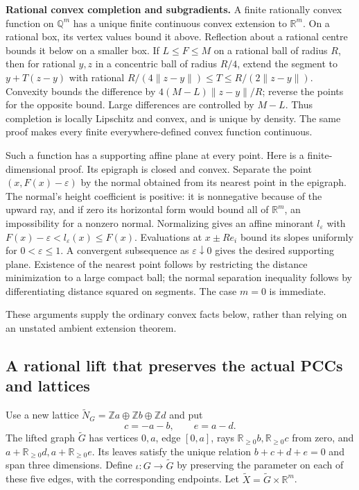 \documentclass[
  11pt,
]{article}
\begin{document}
\textbf{Rational convex completion and subgradients.} A finite
rationally convex function on \(\mathbb Q^m\) has a unique finite
continuous convex extension to \(\mathbb R^m\). On a rational box, its
vertex values bound it above. Reflection about a rational centre bounds
it below on a smaller box. If \(L\leq F\leq M\) on a rational ball of
radius \(R\), then for rational \(y,z\) in a concentric ball of radius
\(R/4\), extend the segment to \(y+T(z-y)\) with rational
\(R/(4\|z-y\|)\leq T\leq R/(2\|z-y\|)\). Convexity bounds the difference
by \(4(M-L)\|z-y\|/R\); reverse the points for the opposite bound. Large
differences are controlled by \(M-L\). Thus completion is locally
Lipschitz and convex, and is unique by density. The same proof makes
every finite everywhere-defined convex function continuous.

Such a function has a supporting affine plane at every point. Here is a
finite-dimensional proof. Its epigraph is closed and convex. Separate
the point \((x,F(x)-\varepsilon)\) by the normal obtained from its
nearest point in the epigraph. The normal's height coefficient is
positive: it is nonnegative because of the upward ray, and if zero its
horizontal form would bound all of \(\mathbb R^m\), an impossibility for
a nonzero normal. Normalizing gives an affine minorant \(l_\varepsilon\)
with \(F(x)-\varepsilon<l_\varepsilon(x)\leq F(x)\). Evaluations at
\(x\pm Re_i\) bound its slopes uniformly for \(0<\varepsilon\leq1\). A
convergent subsequence as \(\varepsilon\downarrow0\) gives the desired
supporting plane. Existence of the nearest point follows by restricting
the distance minimization to a large compact ball; the normal separation
inequality follows by differentiating distance squared on segments. The
case \(m=0\) is immediate.

These arguments supply the ordinary convex facts below, rather than
relying on an unstated ambient extension theorem.

\subsection{A rational lift that preserves the actual PCCs and
lattices}\label{a-rational-lift-that-preserves-the-actual-pccs-and-lattices}

Use a new lattice
\(\widetilde N_G=\mathbb Za\oplus\mathbb Zb\oplus\mathbb Zd\) and put \[
c=-a-b,\qquad e=a-d.
\] The lifted graph \(\widetilde G\) has vertices \(0,a\), edge
\([0,a]\), rays \(\mathbb R_{\geq0}b,\mathbb R_{\geq0}c\) from zero, and
\(a+\mathbb R_{\geq0}d,a+\mathbb R_{\geq0}e\). Its leaves satisfy the
unique relation \(b+c+d+e=0\) and span three dimensions. Define
\(\iota:G\to\widetilde G\) by preserving the parameter on each of these
five edges, with the corresponding endpoints. Let
\(\widetilde X=\widetilde G\times\mathbb R^m\).
\end{document}
